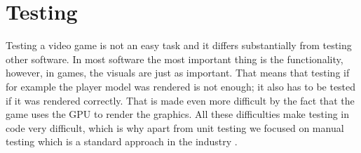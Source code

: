 \chapter{Testing} \label{ch:testing}
Testing a video game is not an easy task and it differs substantially from testing other software.
In most software the most important thing is the functionality, however, in games, the visuals are just as important.
That means that testing if for example the player model was rendered is not enough; it also has to be tested if it was rendered correctly.
That is made even more difficult by the fact that the game uses the GPU to render the graphics.
All these difficulties make testing in code very difficult, which is why apart from unit testing we focused on manual testing which is a standard approach in the industry \cite{DBLP:journals/corr/abs-2103-06431}.


